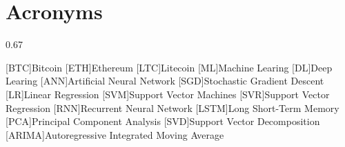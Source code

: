\chapter*{Acronyms}

\begin{acronym}[ARIMA]
{\setlength{\baselineskip}%
{0.67\baselineskip}

[BTC]{Bitcoin}
[ETH]{Ethereum}
[LTC]{Litecoin}
[ML]{Machine Learing}
[DL]{Deep Learing}
[ANN]{Artificial Neural Network}
[SGD]{Stochastic Gradient Descent}
[LR]{Linear Regression}
[SVM]{Support Vector Machines}
[SVR]{Support Vector Regression}
[RNN]{Recurrent Neural Network}
[LSTM]{Long Short-Term Memory}
[PCA]{Principal Component Analysis}
[SVD]{Support Vector Decomposition}
[ARIMA]{Autoregressive Integrated Moving Average}



\par}
\end{acronym}